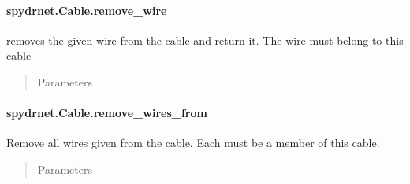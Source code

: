 \documentclass[letterpaper,10pt,english,openany,oneside]{sphinxmanual}
\begin{document}
\paragraph{spydrnet.Cable.remove\_wire}
\label{\detokenize{reference/classes/generated/spydrnet.Cable.remove_wire:spydrnet-cable-remove-wire}}\label{\detokenize{reference/classes/generated/spydrnet.Cable.remove_wire::doc}}

\begin{fulllineitems}
\label{\detokenize{reference/classes/generated/spydrnet.Cable.remove_wire:spydrnet.Cable.remove_wire}}
removes the given wire from the cable and return it. The wire must belong to this cable
\begin{quote}\begin{description}
\item[{Parameters}] \leavevmode
{}

\end{description}\end{quote}

\end{fulllineitems}



\paragraph{spydrnet.Cable.remove\_wires\_from}
\label{\detokenize{reference/classes/generated/spydrnet.Cable.remove_wires_from:spydrnet-cable-remove-wires-from}}\label{\detokenize{reference/classes/generated/spydrnet.Cable.remove_wires_from::doc}}

\begin{fulllineitems}
\label{\detokenize{reference/classes/generated/spydrnet.Cable.remove_wires_from:spydrnet.Cable.remove_wires_from}}
Remove all wires given from the cable. Each must be a member of this cable.
\begin{quote}\begin{description}
\item[{Parameters}] \leavevmode
{}

\end{description}\end{quote}

\end{fulllineitems}
\end{document}
